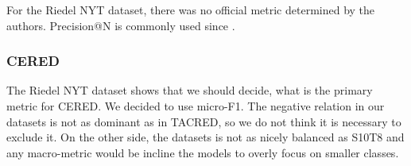 For the Riedel NYT dataset, there was no official metric determined by the authors. Precision@N is commonly used since \citep{Bollacker08freebase}. 


\subsubsection{CERED}

The Riedel NYT dataset shows that we should decide, what is the primary metric for CERED. We decided to use micro-F1. The negative relation in our datasets is not as dominant as in TACRED, so we do not think it is necessary to exclude it. On the other side, the datasets is not as nicely balanced as S10T8 and any macro-metric would be incline the models to overly focus on smaller classes.



